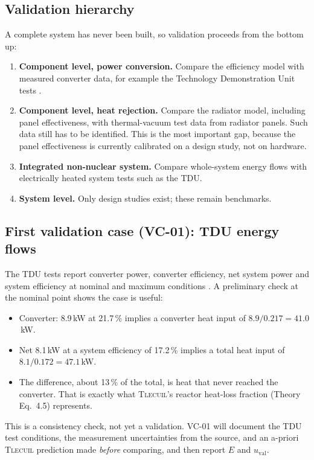 \documentclass[11pt]{article}
\newcommand{\tlecuil}{\textsc{Tlecuil}}
\begin{document}
\subsection{Validation hierarchy}
A complete system has never been built, so validation proceeds from the bottom up:
\begin{enumerate}
  \item \textbf{Component level, power conversion.} Compare the efficiency model with
        measured converter data, for example the Technology Demonstration Unit tests
        \cite{briggs2016tdu}.
  \item \textbf{Component level, heat rejection.} Compare the radiator model, including
        panel effectiveness, with thermal-vacuum test data from radiator panels. Such data
        still has to be identified. This is the most important gap, because the panel
        effectiveness is currently calibrated on a design study, not on hardware.
  \item \textbf{Integrated non-nuclear system.} Compare whole-system energy flows with
        electrically heated system tests such as the TDU.
  \item \textbf{System level.} Only design studies exist; these remain benchmarks.
\end{enumerate}

\subsection{First validation case (VC-01): TDU energy flows}
The TDU tests report converter power, converter efficiency, net system power and system
efficiency at nominal and maximum conditions \cite{briggs2016tdu}. A preliminary check at
the nominal point shows the case is useful:
\begin{itemize}
  \item Converter: 8.9\,kW at 21.7\,\% implies a converter heat input of $8.9/0.217=41.0$\,kW.
  \item Net 8.1\,kW at a system efficiency of 17.2\,\% implies a total heat input of
        $8.1/0.172=47.1$\,kW.
  \item The difference, about 13\,\% of the total, is heat that never reached the converter.
        That is exactly what \tlecuil{}'s reactor heat-loss fraction (Theory Eq.~4.5)
        represents.
\end{itemize}
This is a consistency check, not yet a validation. VC-01 will document the TDU test
conditions, the measurement uncertainties from the source, and an a-priori \tlecuil{}
prediction made \emph{before} comparing, and then report $E$ and $u_\text{val}$.
\end{document}
